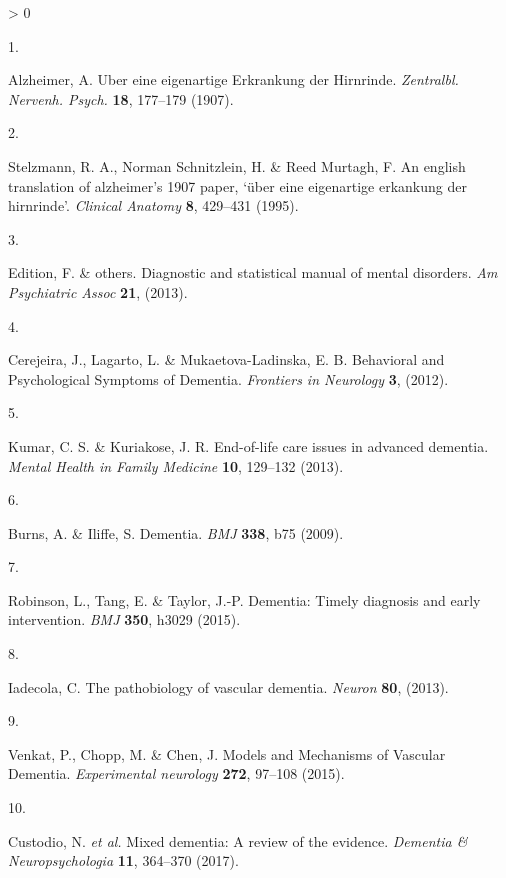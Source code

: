 \documentclass[a4paper, twoside]{templates/ociamthesis}
\newlength{\cslhangindent}
\newlength{\csllabelwidth}
\newenvironment{CSLReferences}[3] %
 {%
  \setlength{\parindent}{0pt}
  \ifodd #1 \everypar{\setlength{\hangindent}{\cslhangindent}}\ignorespaces\fi
  \ifnum #2 > 0
  \setlength{\parskip}{#2\baselineskip}
  \fi
 }%
 {}
\newcommand{\CSLLeftMargin}[1]{\parbox[t]{\maxof{\widthof{#1}}{\csllabelwidth}}{#1}}
\newcommand{\CSLRightInline}[1]{\parbox[t]{\linewidth - \csllabelwidth}{#1}}
\begin{document}
\hypertarget{refs}{}
\begin{CSLReferences}{0}{0}
\leavevmode\hypertarget{ref-alzheimer1907}{}%
\CSLLeftMargin{1. }
\CSLRightInline{Alzheimer, A. Uber eine eigenartige {Erkrankung} der {Hirnrinde}. \emph{Zentralbl. Nervenh. Psych.} \textbf{18}, 177--179 (1907).}

\leavevmode\hypertarget{ref-stelzmann1995}{}%
\CSLLeftMargin{2. }
\CSLRightInline{Stelzmann, R. A., Norman Schnitzlein, H. \& Reed Murtagh, F. An english translation of alzheimer's 1907 paper, {`über eine eigenartige erkankung der hirnrinde'}. \emph{Clinical Anatomy} \textbf{8}, 429--431 (1995).}

\leavevmode\hypertarget{ref-edition2013}{}%
\CSLLeftMargin{3. }
\CSLRightInline{Edition, F. \& others. Diagnostic and statistical manual of mental disorders. \emph{Am Psychiatric Assoc} \textbf{21}, (2013).}

\leavevmode\hypertarget{ref-cerejeira2012}{}%
\CSLLeftMargin{4. }
\CSLRightInline{Cerejeira, J., Lagarto, L. \& Mukaetova-Ladinska, E. B. Behavioral and {Psychological Symptoms} of {Dementia}. \emph{Frontiers in Neurology} \textbf{3}, (2012).}

\leavevmode\hypertarget{ref-kumar2013}{}%
\CSLLeftMargin{5. }
\CSLRightInline{Kumar, C. S. \& Kuriakose, J. R. End-of-life care issues in advanced dementia. \emph{Mental Health in Family Medicine} \textbf{10}, 129--132 (2013).}

\leavevmode\hypertarget{ref-burns2009}{}%
\CSLLeftMargin{6. }
\CSLRightInline{Burns, A. \& Iliffe, S. Dementia. \emph{BMJ} \textbf{338}, b75 (2009).}

\leavevmode\hypertarget{ref-robinson2015}{}%
\CSLLeftMargin{7. }
\CSLRightInline{Robinson, L., Tang, E. \& Taylor, J.-P. Dementia: Timely diagnosis and early intervention. \emph{BMJ} \textbf{350}, h3029 (2015).}

\leavevmode\hypertarget{ref-iadecola2013}{}%
\CSLLeftMargin{8. }
\CSLRightInline{Iadecola, C. The pathobiology of vascular dementia. \emph{Neuron} \textbf{80}, (2013).}

\leavevmode\hypertarget{ref-venkat2015}{}%
\CSLLeftMargin{9. }
\CSLRightInline{Venkat, P., Chopp, M. \& Chen, J. Models and {Mechanisms} of {Vascular Dementia}. \emph{Experimental neurology} \textbf{272}, 97--108 (2015).}

\leavevmode\hypertarget{ref-custodio2017}{}%
\CSLLeftMargin{10. }
\CSLRightInline{Custodio, N. \emph{et al.} Mixed dementia: A review of the evidence. \emph{Dementia \& Neuropsychologia} \textbf{11}, 364--370 (2017).}


\end{CSLReferences}
\end{document}

